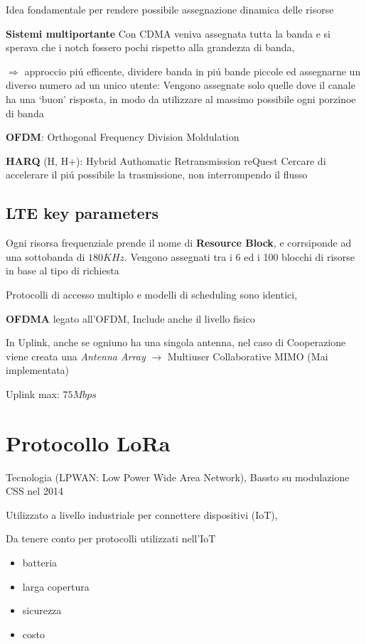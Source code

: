 \documentclass{article}
\begin{document}
Idea fondamentale per rendere possibile assegnazione dinamica delle risorse

\textbf{Sistemi multiportante}
Con CDMA veniva assegnata tutta la banda e si sperava che i notch fossero pochi rispetto alla grandezza di banda,

$\Rightarrow$ approccio pi\'u efficente, dividere banda in pi\'u bande piccole ed assegnarne un diverso numero ad un unico utente:
Vengono assegnate solo quelle dove il canale ha una `buon' risposta, in modo da utilizzare al massimo possibile ogni porzinoe di banda

\textbf{OFDM}: Orthogonal Frequency Division Moldulation

\textbf{HARQ} (H, H+):  Hybrid Authomatic Retransmission reQuest
Cercare di accelerare il pi\'u possibile la trasmissione, non interrompendo il flusso

\subsection{LTE key parameters}

Ogni risorsa frequenziale prende il nome di \textbf{Resource Block}, e corrsiponde ad una sottobanda di $180KHz$.
Vengono assegnati tra i 6 ed i 100 blocchi di risorse in base al tipo di richiesta

Protocolli di accesso multiplo e modelli di scheduling sono identici,

\textbf{OFDMA} legato all'OFDM, Include anche il livello fisico

In Uplink, anche se ogniuno ha una singola antenna, nel caso di Cooperazione viene creata una \textit{Antenna Array} $\rightarrow$ Multiuser Collaborative MIMO (Mai implementata)

Uplink max: $75Mbps$

\section{Protocollo LoRa}
Tecnologia (LPWAN: Low Power Wide Area Network), Bassto su modulazione CSS nel 2014

Utilizzato a livello industriale per connettere dispositivi (IoT),

Da tenere conto per protocolli utilizzati nell'IoT
\begin{itemize}
    \item batteria
    \item larga copertura
    \item sicurezza
    \item costo
\end{itemize}
\end{document}
